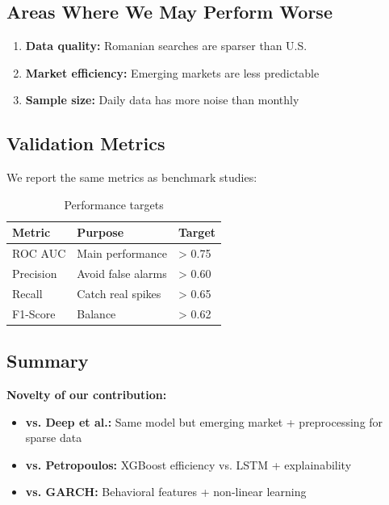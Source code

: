 \documentclass[12pt,a4paper]{article}
\begin{document}
\subsection{Areas Where We May Perform Worse}

\begin{enumerate}
    \item \textbf{Data quality:} Romanian searches are sparser than U.S.
    \item \textbf{Market efficiency:} Emerging markets are less predictable
    \item \textbf{Sample size:} Daily data has more noise than monthly
\end{enumerate}

\subsection{Validation Metrics}

We report the same metrics as benchmark studies:

\begin{table}[h]
\centering
\begin{tabular}{lll}
\hline
\textbf{Metric} & \textbf{Purpose} & \textbf{Target} \\
\hline
ROC AUC & Main performance & > 0.75 \\
Precision & Avoid false alarms & > 0.60 \\
Recall & Catch real spikes & > 0.65 \\
F1-Score & Balance & > 0.62 \\
\hline
\end{tabular}
\caption{Performance targets}
\end{table}

\subsection{Summary}

\textbf{Novelty of our contribution:}

\begin{itemize}
    \item \textbf{vs. Deep et al.:} Same model but emerging market + preprocessing for sparse data
    \item \textbf{vs. Petropoulos:} XGBoost efficiency vs. LSTM + explainability
    \item \textbf{vs. GARCH:} Behavioral features + non-linear learning
\end{itemize}
\end{document}
